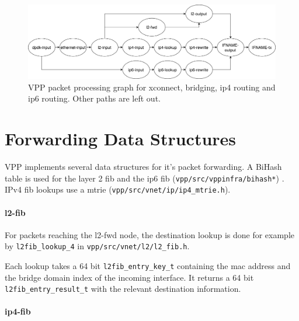 \begin{figure}[!ht]
\noindent\hspace{0.5mm}\includegraphics[width=\linewidth]{pics/vpp-nodes-horizontal.png}
\caption{VPP packet processing graph for xconnect, bridging, \Ac{ip4} routing and \Ac{ip6} routing. Other paths are left out. }
\label{nodegraph}
\end{figure}

 
\section{Forwarding Data Structures}

VPP implements several data structures for it's packet forwarding. A
BiHash table is used for the layer 2 \Ac{fib} and the ip6 \Ac{fib}
(\lstinline|vpp/src/vppinfra/bihash*|) \cite{vppwiki:bihash}. IPv4
\Ac{fib} lookups use a mtrie
(\lstinline|vpp/src/vnet/ip/ip4_mtrie.h|).



\paragraph{l2-fib}

For packets reaching the l2-fwd node, the destination lookup is done
for example by \lstinline|l2fib_lookup_4| in
\lstinline|vpp/src/vnet/l2/l2_fib.h|. 

Each lookup takes a 64 bit \lstinline|l2fib_entry_key_t| containing
the mac address and the bridge domain index of the incoming interface.
It returns a 64 bit \lstinline|l2fib_entry_result_t| with the relevant
destination information. 


\paragraph{\Ac{ip4}-fib}

